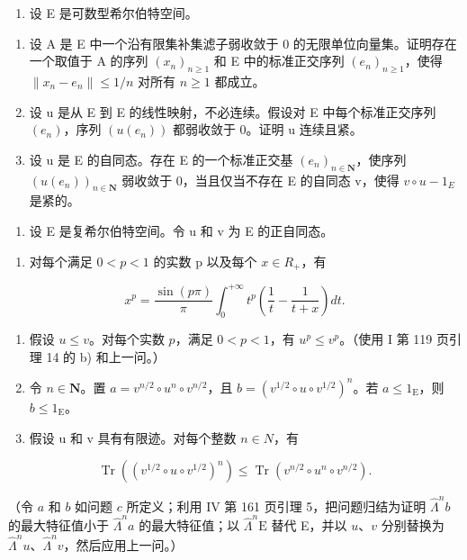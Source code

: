 \begin{enumerate}
\def\labelenumi{\arabic{enumi})}
\setcounter{enumi}{20}
\tightlist
\item
  设 E 是可数型希尔伯特空间。
\end{enumerate}

\begin{enumerate}
\def\labelenumi{\alph{enumi})}
\item
  设 A 是 E 中一个沿有限集补集滤子弱收敛于 0 的无限单位向量集。证明存在一个取值于 A 的序列 \((x_{n})_{n\geqslant1}\) 和 E 中的标准正交序列 \((e_{n})_{n\geqslant1}\)，使得 \(\|x_{n}-e_{n}\|\leqslant1/n\) 对所有 \(n\geqslant1\) 都成立。
\item
  设 u 是从 E 到 E 的线性映射，不必连续。假设对 E 中每个标准正交序列 \((e_{n})\)，序列 \((u(e_{n}))\) 都弱收敛于 0。证明 u 连续且紧。
\item
  设 u 是 E 的自同态。存在 E 的一个标准正交基 \((e_{n})_{n\in\mathbf{N}}\)，使序列 \((u(e_{n}))_{n\in\mathbf{N}}\) 弱收敛于 0，当且仅当不存在 E 的自同态 v，使得 \(v\circ u-1_{E}\) 是紧的。
\end{enumerate}

\begin{enumerate}
\def\labelenumi{\arabic{enumi})}
\setcounter{enumi}{21}
\tightlist
\item
  设 E 是复希尔伯特空间。令 u 和 v 为 E 的正自同态。
\end{enumerate}

\begin{enumerate}
\def\labelenumi{\alph{enumi})}
\tightlist
\item
  对每个满足 \(0 < p < 1\) 的实数 p 以及每个 \(x \in R_{+}\)，有
\end{enumerate}

\[
x ^ {p} = \frac {\sin (p \pi)}{\pi} \int_ {0} ^ {+ \infty} t ^ {p} \left(\frac {1}{t} - \frac {1}{t + x}\right) d t.
\]

\begin{enumerate}
\def\labelenumi{\alph{enumi})}
\setcounter{enumi}{1}
\item
  假设 \(u \leqslant v\)。对每个实数 \(p\)，满足 \(0 < p < 1\)，有 \(u^p \leqslant v^p\)。（使用 I 第 119 页引理 14 的 b) 和上一问。）\\
\item
  令 \(n \in \mathbf{N}\)。置 \(a = v^{n/2} \circ u^n \circ v^{n/2}\)，且 \(b = (v^{1/2} \circ u \circ v^{1/2})^n\)。若 \(a \leqslant 1_{\mathrm{E}}\)，则 \(b \leqslant 1_{\mathrm{E}}\)。
\item
  假设 u 和 v 具有有限迹。对每个整数 \(n \in N\)，有
\end{enumerate}

\[
\operatorname{Tr} \left(\left(v ^ {1 / 2} \circ u \circ v ^ {1 / 2}\right) ^ {n}\right) \leqslant \operatorname{Tr} \left(v ^ {n / 2} \circ u ^ {n} \circ v ^ {n / 2}\right).
\]

（令 \(a\) 和 \(b\) 如问题 \(c\) 所定义；利用 IV 第 161 页引理 5，把问题归结为证明 \(\widehat{\Lambda}^{n}b\) 的最大特征值小于 \(\widehat{\Lambda}^{n}a\) 的最大特征值；以 \(\widehat{\Lambda}^{n}\mathrm{E}\) 替代 E，并以 \(u\)、\(v\) 分别替换为 \(\widehat{\Lambda}^{n}u\)、\(\widehat{\Lambda}^{n}v\)，然后应用上一问。）